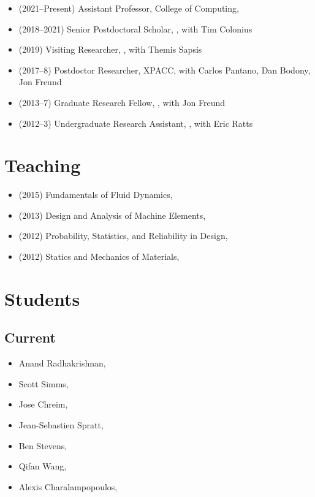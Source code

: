 \begin{itemize}
    \item (2021--Present) Assistant Professor, College of Computing, \GIT
    \item (2018--2021) Senior Postdoctoral Scholar, \CIT, with Tim Colonius
    \item (2019) Visiting Researcher, \MIT, with Themis Sapsis
    \item (2017--8) Postdoctor Researcher, XPACC, with Carlos Pantano, Dan Bodony, Jon Freund
    \item (2013--7) Graduate Research Fellow, \UIUC, with Jon Freund
    \item (2012--3) Undergraduate Research Assistant, \UMD, with Eric Ratts
\end{itemize}

\section{Teaching}

\begin{itemize}
    \item (2015) Fundamentals of Fluid Dynamics, \UIUC
    \item (2013) Design and Analysis of Machine Elements, \UMD
    \item (2012) Probability, Statistics, and Reliability in Design, \UMD
    \item (2012) Statics and Mechanics of Materials, \UMD
\end{itemize}


\section{Students}

\subsection{Current}

\begin{itemize}
    \item Anand Radhakrishnan, \GIT
    \item Scott Simms, \GIT
    \item Jose Chreim, \CIT
    \item Jean-Sebastien Spratt, \CIT
    \item Ben Stevens, \CIT
    \item Qifan Wang, \CIT
    \item Alexis Charalampopoulos, \MIT
\end{itemize}

